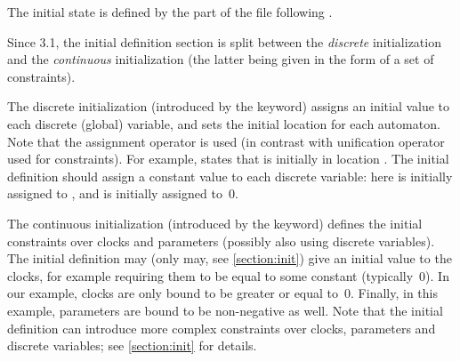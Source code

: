The initial state is defined by the part of the file following .

Since \imitator{} 3.1, the initial definition section is split between the \emph{discrete} initialization and the \emph{continuous} initialization (the latter being given in the form of a set of constraints).


The discrete initialization (introduced by the  keyword) assigns an initial value to each discrete (global) variable, and sets the initial location for each automaton.
Note that the assignment operator \styleIMI{:=} is used (in contrast with unification operator \styleIMI{=} used for constraints).
%
%
For example,  states that  is initially in location .
The initial definition should assign a constant value to each discrete variable:
here  is initially assigned to , and  is initially assigned to~0.

The continuous initialization (introduced by the  keyword) defines the initial constraints over clocks and parameters (possibly also using discrete variables).
%
The initial definition may (only may, see \cref{section:init}) give an initial value to the clocks, for example requiring them to be equal to some constant (typically~0).
In our example, clocks are only bound to be greater or equal to~0.
%
Finally, in this example, parameters are bound to be non-negative as well.
%
Note that the initial definition can introduce more complex constraints over clocks, parameters and discrete variables; see \cref{section:init} for details.




